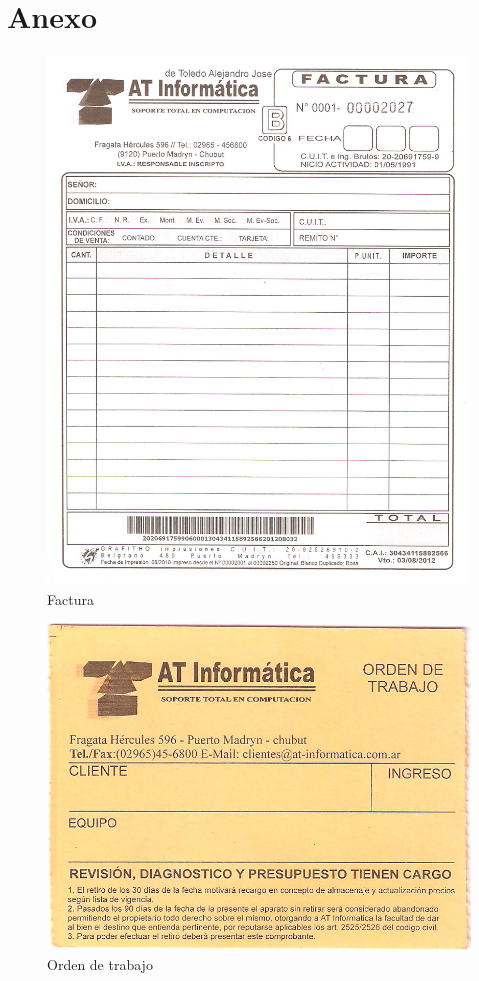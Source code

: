 \documentclass[12pt]{extarticle}
\begin{document}
	\pagebreak

	\section{Anexo}


	\begin{figure}[h]
	\includegraphics[scale=0.3]{images/atinformatica-facturaB.jpg}
	\caption{Factura}
	\end{figure}

	\begin{figure}[h]
	\includegraphics[scale=0.5]{images/atinformatica-orden_de_trabajo.jpg}
	\caption{Orden de trabajo}
	\end{figure}
\end{document}
